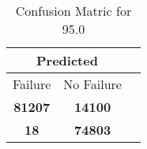 \begin{table}[] 
\caption{Confusion Matric for 95.0} 
\label{Table: Prediction Accuracy-DMD95.0OnlySunEKF-combinationReflectionEKF-top2-Reflection} 
\centering 
\begin{tabular} 
 {@{}ccc@{}} 
\toprule 
\multicolumn{2}{c}{\textbf{Predicted}}
 \\ \midrule 
\multicolumn{1}{|c|}{Failure} & 
\multicolumn{1}{c|}{No Failure}
 \\ \midrule 
\multicolumn{1}{|c|}{\color{green}\textbf{81207}} & 
\multicolumn{1}{c|}{\color{red}\textbf{14100}}
 \\ \midrule 
\multicolumn{1}{|c|}{\color{red}\textbf{18}} & 
\multicolumn{1}{c|}{\color{green}\textbf{74803}}
 \\ \bottomrule 
\end{tabular} 
\end{table} 
